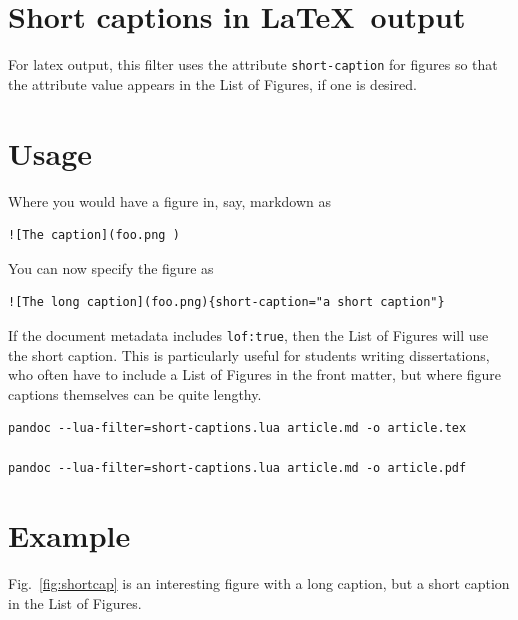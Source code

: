 \hypertarget{short-captions-in-output}{%
\section{\texorpdfstring{Short captions in
\LaTeX~output}{Short captions in ~output}}\label{short-captions-in-output}}

For latex output, this filter uses the attribute \texttt{short-caption}
for figures so that the attribute value appears in the List of Figures,
if one is desired.

\hypertarget{usage}{%
\section{Usage}\label{usage}}

Where you would have a figure in, say, markdown as

\begin{verbatim}
![The caption](foo.png ) 
\end{verbatim}

You can now specify the figure as

\begin{verbatim}
![The long caption](foo.png){short-caption="a short caption"} 
\end{verbatim}

If the document metadata includes \texttt{lof:true}, then the List of
Figures will use the short caption. This is particularly useful for
students writing dissertations, who often have to include a List of
Figures in the front matter, but where figure captions themselves can be
quite lengthy.

\begin{verbatim}
pandoc --lua-filter=short-captions.lua article.md -o article.tex

pandoc --lua-filter=short-captions.lua article.md -o article.pdf
\end{verbatim}

\hypertarget{example}{%
\section{Example}\label{example}}

Fig.~\ref{fig:shortcap} is an interesting figure with a long caption,
but a short caption in the List of Figures.

